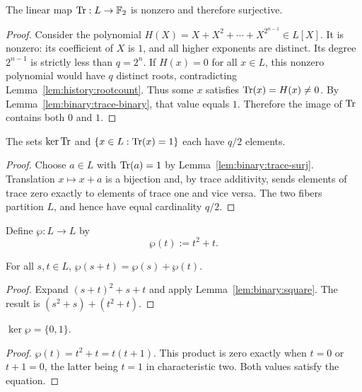 \begin{lemma}\label{lem:binary:trace-surj}
The linear map $\operatorname{Tr}:L\to\mathbb{F}_2$ is nonzero and therefore surjective.
\end{lemma}
\begin{proof}
Consider the polynomial
$H(X)=X+X^2+\cdots+X^{2^{n-1}}\in L[X]$.
It is nonzero: its coefficient of $X$ is $1$, and all higher
exponents are distinct. Its degree $2^{n-1}$ is strictly less than
$q=2^n$. If $H(x)=0$ for all $x\in L$, this nonzero polynomial
would have $q$ distinct roots, contradicting
Lemma~\ref{lem:history:rootcount}. Thus some $x$ satisfies
$\operatorname{Tr}(x)=H(x)\neq0$. By Lemma~\ref{lem:binary:trace-binary},
that value equals $1$. Therefore the image of $\operatorname{Tr}$ contains
both $0$ and $1$.
\end{proof}

\begin{corollary}\label{cor:binary:trace-fibers}
The sets $\ker\operatorname{Tr}$ and $\{x\in L:\operatorname{Tr}(x)=1\}$ each have
$q/2$ elements.
\end{corollary}
\begin{proof}
Choose $a\in L$ with $\operatorname{Tr}(a)=1$ by
Lemma~\ref{lem:binary:trace-surj}. Translation $x\mapsto x+a$
is a bijection and, by trace additivity, sends elements of trace
zero exactly to elements of trace one and vice versa.
The two fibers partition $L$, and hence have equal cardinality
$q/2$.
\end{proof}

\begin{definition}\label{def:binary:artin-schreier}
Define $\wp:L\to L$ by
\[
 \wp(t):=t^2+t.
\]
\end{definition}

\begin{lemma}\label{lem:binary:as-linear}
For all $s,t\in L$, $\wp(s+t)=\wp(s)+\wp(t)$.
\end{lemma}
\begin{proof}
Expand $(s+t)^2+s+t$ and apply
Lemma~\ref{lem:binary:square}. The result is
$(s^2+s)+(t^2+t)$.
\end{proof}

\begin{lemma}\label{lem:binary:as-kernel}
$\ker\wp=\{0,1\}$.
\end{lemma}
\begin{proof}
$\wp(t)=t^2+t=t(t+1)$. This product is zero exactly when
$t=0$ or $t+1=0$, the latter being $t=1$ in characteristic two.
Both values satisfy the equation.
\end{proof}

